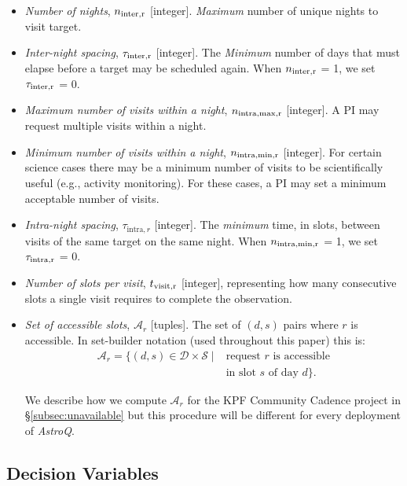 \documentclass[twocolumn,linenumbers]{aastex63}
\def\intra{\mathrm{intra}}
\def\Dcal{\mathcal{D}}
\def\Scal{\mathcal{S}}
\newcommand{\AstroQ}{\textit{AstroQ}\xspace}
\newcommand{\isr}[2]{\ensuremath{#1_{\rm #2}}\xspace}
\begin{document}
\begin{itemize}
    \item {\em Number of nights}, \isr{n}{inter,r} [integer]. {\em Maximum} number of unique nights to visit target.

    \item {\em Inter-night spacing}, \isr{\tau}{inter,r} [integer]. The {\em Minimum} number of days that must elapse before a target may be scheduled again. When \isr{n}{inter,r} = 1, we set \isr{\tau}{inter,r} = 0.

    \item {\em Maximum number of visits within a night}, \isr{n}{intra,max,r} [integer]. A PI may request multiple visits within a night. 

    \item {\em Minimum number of visits within a night}, \isr{n}{intra, min, r} [integer]. For certain science cases there may be a minimum number of visits to be scientifically useful (e.g., activity monitoring). For these cases, a PI may set a minimum acceptable number of visits. 
    
    \item {\em Intra-night spacing}, $\tau_{\intra,r}$ [integer]. The {\em minimum} time, in slots, between visits of the same target on the same night. When \isr{n}{intra, min, r} = 1, we set \isr{\tau}{intra, r} = 0.
    
   \item {\em Number of slots per visit}, \isr{t}{visit,r} [integer], representing how many consecutive slots a single visit requires to complete the observation.

    \item {\em Set of accessible slots}, $\mathcal{A}_{r}$ [tuples]. The set of $(d,s)$ pairs where $r$ is accessible. In set-builder notation (used throughout this paper) this is: 
    \begin{align*}
    \mathcal{A}_{r} = \{(d,s) \in \Dcal \times \Scal \mid &\text{request $r$ is accessible}  \\ 
    &\text{in slot $s$ of day $d$} \}.
    \end{align*}

    We describe how we compute $\mathcal{A}_{r}$ for the KPF Community Cadence project in \S\ref{subsec:unavailable} but this procedure will be different for every deployment of \AstroQ.

\end{itemize}

\subsection{Decision Variables}
\label{variables}
\end{document}
